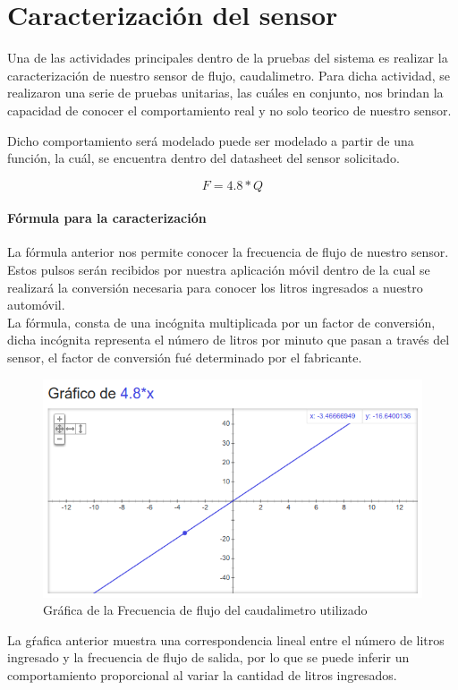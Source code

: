 \section{Caracterización del sensor}
Una de las actividades principales dentro de la pruebas del sistema es realizar la caracterización de nuestro sensor de flujo, caudalimetro.
Para dicha actividad, se realizaron una serie de pruebas unitarias, las cuáles en conjunto, nos brindan la capacidad de conocer el comportamiento
real y no solo teorico de nuestro sensor.

Dicho comportamiento será modelado puede ser modelado a partir de una función, la cuál, se encuentra dentro del datasheet del sensor solicitado.

\begin{equation}
F = 4.8 * Q
\end{equation}

\paragraph{Fórmula para la caracterización}
La fórmula anterior nos permite conocer la frecuencia de flujo de nuestro sensor. Estos pulsos serán recibidos por nuestra aplicación móvil dentro de la cual se realizará la conversión necesaria para conocer los litros ingresados a nuestro automóvil.\\
La fórmula, consta de una incógnita multiplicada por un factor de conversión, 
dicha incógnita representa el número de litros por minuto que pasan a través del sensor, el factor de conversión fué determinado por el fabricante.

\begin{figure}[H]
	\centering
	\includegraphics[width=.7\textwidth]{Capitulo6/caracterizacion/img/FormulaSensor.png}
	\caption{Gráfica de la Frecuencia de flujo del caudalimetro utilizado}
\end{figure}

La gŕafica anterior muestra una correspondencia lineal entre el número de litros ingresado y la frecuencia de flujo de salida, por lo que se puede inferir un comportamiento proporcional al variar la cantidad de litros ingresados.

